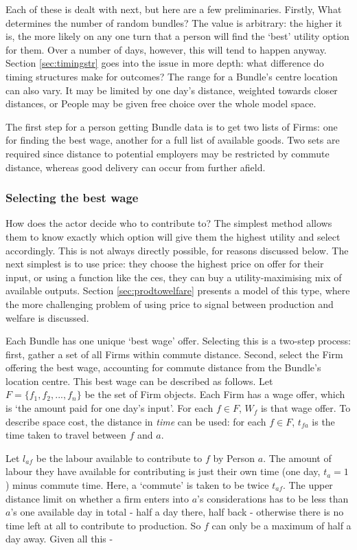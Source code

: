 Each of these is dealt with next, but here are a few preliminaries. Firstly, What determines the number of random bundles? The value is arbitrary: the higher it is, the more likely on any one turn that a person will find the `best' utility option for them. Over a number of days, however, this will tend to happen anyway. Section \ref{sec:timingstr} goes into the issue in more depth: what difference do timing structures make for outcomes? The range for a Bundle's centre location can also vary. It may be limited by one day's distance, weighted towards closer distances, or People may be given free choice over the whole model space.

The first step for a person getting Bundle data is to get two lists of Firms: one for finding the best wage, another for a full list of available goods. Two sets are required since distance to potential employers may be restricted by commute distance, whereas good delivery can occur from further afield.


\subsubsection{Selecting the best wage \label{sec:wageselect}}

How does the actor decide who to contribute to? The simplest method allows them to know exactly which option will give them the highest utility and select accordingly. This is not always directly possible, for reasons discussed below. The next simplest is to use price: they choose the highest price on offer for their input, or using a function like the \gls{ces}, they can buy a utility-maximising mix of available outputs. Section \ref{sec:prodtowelfare} presents a model of this type, where the more challenging problem of using price to signal between production and welfare is discussed. 

Each Bundle has one unique `best wage' offer. Selecting this is a two-step process: first, gather a set of all Firms within commute distance. Second, select the Firm offering the best wage, accounting for commute distance from the Bundle's location centre. This best wage can be described as follows. Let $F=\{f_{1},f_{2},...,f_{n}\}$ be the set of Firm objects. Each Firm has a wage offer, which is `the amount paid for one day's input'. For each $f\in F$, $W_{f}$ is that wage offer. To describe space cost, the distance in \emph{time} can be used: for each $f\in F$, $t_{fa}$ is the time taken to travel between $f$ and $a$. 

Let $l_{af}$ be the labour available to contribute to $f$ by Person $a$. The amount of labour they have available for contributing is just their own time (one day, $t_{a}=1$) minus commute time. Here, a `commute' is taken to be twice $t_{af}$. The upper distance limit on whether a firm enters into $a$'s considerations has to be less than $a$'s one available day in total - half a day there, half back - otherwise there is no time left at all to contribute to production. So $f$ can only be a maximum of half a day away. Given all this -


